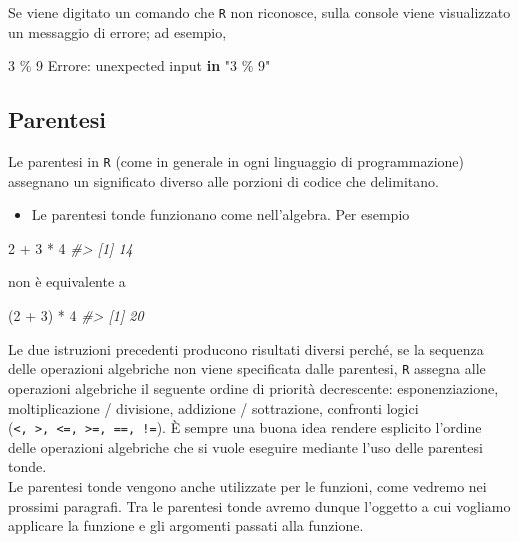 \documentclass[
]{memoir}
\newenvironment{Shaded}{\begin{snugshade}}{\end{snugshade}}
\newcommand{\CommentTok}[1]{\textcolor[rgb]{0.56,0.35,0.01}{\textit{#1}}}
\newcommand{\ControlFlowTok}[1]{\textcolor[rgb]{0.13,0.29,0.53}{\textbf{#1}}}
\newcommand{\DecValTok}[1]{\textcolor[rgb]{0.00,0.00,0.81}{#1}}
\newcommand{\NormalTok}[1]{#1}
\newcommand{\SpecialCharTok}[1]{\textcolor[rgb]{0.00,0.00,0.00}{#1}}
\newcommand{\StringTok}[1]{\textcolor[rgb]{0.31,0.60,0.02}{#1}}
\providecommand{\tightlist}{%
  \setlength{\itemsep}{0pt}\setlength{\parskip}{0pt}}
\theoremstyle{definition}
\theoremstyle{definition}
\theoremstyle{definition}
\theoremstyle{definition}
\theoremstyle{remark}
\begin{document}
Se viene digitato un comando che \texttt{R} non riconosce, sulla console viene visualizzato un messaggio di errore; ad esempio,

\begin{Shaded}
\begin{Highlighting}[]
\DecValTok{3}\NormalTok{ \% }\DecValTok{9}
\NormalTok{Errore}\SpecialCharTok{:}\NormalTok{ unexpected input }\ControlFlowTok{in} \StringTok{"3 \% 9"}
\end{Highlighting}
\end{Shaded}

\hypertarget{parentesi}{%
\subsection{Parentesi}\label{parentesi}}

Le parentesi in \texttt{R} (come in generale in ogni linguaggio di programmazione) assegnano un significato diverso alle porzioni di codice che delimitano.

\begin{itemize}
\tightlist
\item
  Le parentesi tonde funzionano come nell'algebra. Per esempio
\end{itemize}

\begin{Shaded}
\begin{Highlighting}[]
\DecValTok{2} \SpecialCharTok{+} \DecValTok{3} \SpecialCharTok{*} \DecValTok{4}
\CommentTok{\#\textgreater{} [1] 14}
\end{Highlighting}
\end{Shaded}

non è equivalente a

\begin{Shaded}
\begin{Highlighting}[]
\NormalTok{(}\DecValTok{2} \SpecialCharTok{+} \DecValTok{3}\NormalTok{) }\SpecialCharTok{*} \DecValTok{4}
\CommentTok{\#\textgreater{} [1] 20}
\end{Highlighting}
\end{Shaded}

Le due istruzioni precedenti producono risultati diversi perché, se
la sequenza delle operazioni algebriche non viene specificata dalle
parentesi, \texttt{R} assegna alle operazioni algebriche il seguente ordine
di priorità decrescente: esponenziazione, moltiplicazione /
divisione, addizione / sottrazione, confronti logici
(\texttt{\textless{},\ \textgreater{},\ \textless{}=,\ \textgreater{}=,\ ==,\ !=}). È sempre una buona idea rendere esplicito
l'ordine delle operazioni algebriche che si vuole eseguire mediante
l'uso delle parentesi tonde.\\
Le parentesi tonde vengono anche utilizzate per le funzioni, come
vedremo nei prossimi paragrafi. Tra le parentesi tonde avremo dunque
l'oggetto a cui vogliamo applicare la funzione e gli argomenti
passati alla funzione.
\end{document}

